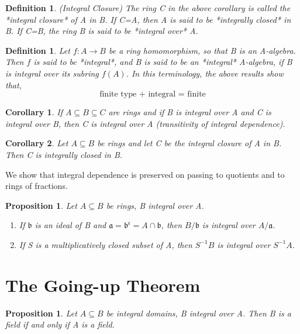 \documentclass[]{report}
\newtheorem{prop}[theorem]{Proposition}
\newtheorem{corollary}{Corollary}[theorem]
\newtheorem{defn}[theorem]{Definition}
\begin{document}
\begin{defn}
    (Integral Closure) The ring C in the above corollary is called the *integral closure* of A in B. If C=A, then A is said to be *integrally closed* in B. If C=B, the ring B is said to be *integral over* A.
\end{defn}

\begin{defn}
    Let $f:A\rightarrow B$ be a ring homomorphism, so that B is an A-algebra. Then $f$ is said to be *integral*, and B is said to be an *integral* A-algebra, if B is integral over its subring $f(A)$. In this terminology, the above results show that,
$$\text{finite type + integral = finite}$$
\end{defn}

\begin{corollary}
    If $A\subseteq B \subseteq C$ are rings and if B is integral over A and C is integral over B, then C is integral over A (transitivity of integral dependence). 
\end{corollary}

\begin{corollary}
    Let $A\subseteq B$ be rings and let C be the integral closure of A in B. Then C is integrally closed in B. 
\end{corollary}

We show that integral dependence is preserved on passing to quotients and to rings of fractions. 

\begin{prop}
    Let $A\subseteq B$ be rings, B integral over A.
    \begin{enumerate}
        \item If $\mathfrak{b}$ is an ideal of B and $\mathfrak{a = b^c} = A \cap \mathfrak{b}$, then $B/\mathfrak{b}$ is integral over $A/\mathfrak{a}$. 
        \item If S is a multiplicatively closed subset of A, then $S^{-1}B$ is integral over $S^{-1}A$.
    \end{enumerate}
\end{prop}

\section{The Going-up Theorem}

\begin{prop}
    Let $A\subseteq B$ be integral domains, B integral over A. Then B is a field if and only if A is a field. 
\end{prop}
\end{document}
